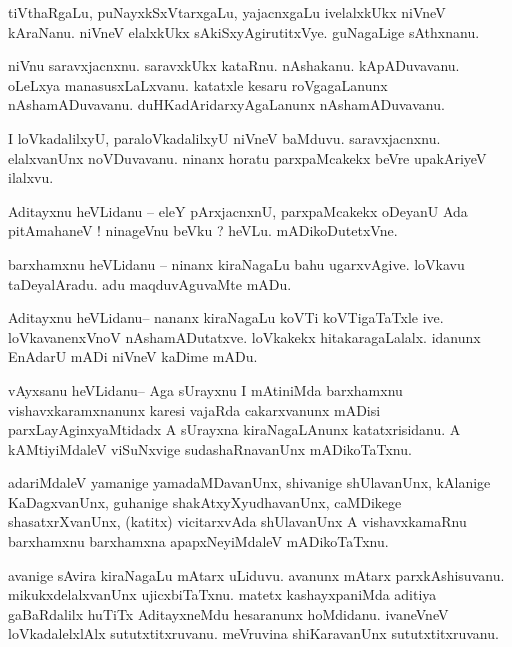 \documentclass{article}
\begin{document}
\begin{mng}%
tiVthaRgaLu, puNayxkSxVtarxgaLu, yajacnxgaLu ivelalxkUkx niVneV kAraNanu. niVneV elalxkUkx 
sAkiSxyAgirutitxVye. guNagaLige sAthxnanu.
\end{mng}

\begin{mng}%
niVnu saravxjacnxnu. saravxkUkx kataRnu. nAshakanu. kApADuvavanu. oLeLxya manasusxLaLxvanu. 
katatxle kesaru roVgagaLanunx nAshamADuvavanu. duHKadAridarxyAgaLanunx nAshamADuvavanu.
\end{mng}

\begin{mng}%
I loVkadalilxyU, paraloVkadalilxyU niVneV baMduvu. saravxjacnxnu. elalxvanUnx noVDuvavanu. ninanx 
horatu parxpaMcakekx beVre upakAriyeV ilalxvu.
\end{mng}

\begin{mng}%
Aditayxnu heVLidanu -- eleY pArxjacnxnU, parxpaMcakekx oDeyanU Ada pitAmahaneV ! ninageVnu beVku ? 
heVLu. mADikoDutetxVne.
\end{mng}

\begin{mng}%
barxhamxnu heVLidanu -- ninanx kiraNagaLu bahu ugarxvAgive. loVkavu taDeyalAradu. adu 
maqduvAguvaMte mADu.
\end{mng}

\begin{mng}%
Aditayxnu heVLidanu-- nananx kiraNagaLu koVTi koVTigaTaTxle ive. loVkavanenxVnoV nAshamADutatxve. 
loVkakekx hitakaragaLalalx. idanunx EnAdarU mADi niVneV kaDime mADu.
\end{mng}

\begin{mng}%
vAyxsanu heVLidanu-- Aga sUrayxnu I mAtiniMda barxhamxnu vishavxkaramxnanunx karesi vajaRda 
cakarxvanunx mADisi parxLayAginxyaMtidadx A sUrayxna kiraNagaLAnunx katatxrisidanu. A 
kAMtiyiMdaleV viSuNxvige sudashaRnavanUnx mADikoTaTxnu.
\end{mng}

\begin{mng}%
adariMdaleV yamanige yamadaMDavanUnx, shivanige shUlavanUnx, kAlanige KaDagxvanUnx, guhanige 
shakAtxyXyudhavanUnx, caMDikege shasatxrXvanUnx, (katitx) vicitarxvAda shUlavanUnx A 
vishavxkamaRnu barxhamxnu barxhamxna apapxNeyiMdaleV mADikoTaTxnu.
\end{mng}

\begin{mng}%
avanige sAvira kiraNagaLu mAtarx uLiduvu. avanunx mAtarx parxkAshisuvanu. mikukxdelalxvanUnx 
ujicxbiTaTxnu. matetx kashayxpaniMda aditiya gaBaRdalilx huTiTx AditayxneMdu hesaranunx hoMdidanu. 
ivaneVneV loVkadalelxlAlx sututxtitxruvanu. meVruvina shiKaravanUnx sututxtitxruvanu. 
\end{mng}
\end{document}
